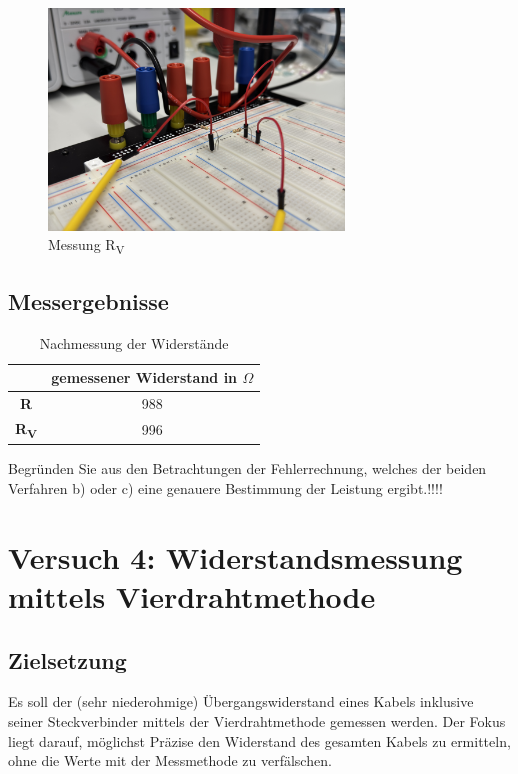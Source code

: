 \documentclass[a4paper,12pt]{article}
\begin{document}
\begin{figure}[H]
    \centering
    \includegraphics[width=0.7\textwidth]{../Quellen/Labor2/Fotos/IMG_3980.jpeg}
\caption{Messung R\textsubscript{V}}
\end{figure}


\subsection{Messergebnisse}
\begin{table}[H]
	\centering
	\begin{tabular}{|c|c|}
		\hline
		  & gemessener Widerstand in $\Omega$\\
		\hline		
		\textbf{R} & 988\\
		\hline
		\textbf{R\textsubscript{V}} & 996\\
		\hline
	\end{tabular}
	\caption{Nachmessung der Widerstände}
\end{table}
Begründen Sie aus den Betrachtungen der Fehlerrechnung, welches der beiden Verfahren b) oder c) 
eine genauere Bestimmung der Leistung ergibt.!!!!


\newpage
\section{Versuch 4: Widerstandsmessung mittels Vierdrahtmethode}
\subsection{Zielsetzung}
Es soll der (sehr niederohmige) Übergangswiderstand eines Kabels inklusive seiner Steckverbinder
mittels der Vierdrahtmethode gemessen werden. Der Fokus liegt darauf, möglichst Präzise den Widerstand des gesamten Kabels zu ermitteln, ohne die Werte mit der Messmethode zu verfälschen.
\end{document}
